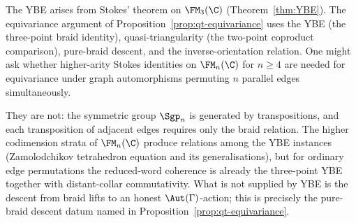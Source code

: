 \begin{remark}
\label{rem:stokes-hierarchy}
%
%
The YBE arises from Stokes' theorem on $\FM_3(\C)$
(Theorem~\ref{thm:YBE}). The equivariance argument of
Proposition~\ref{prop:qt-equivariance} uses the YBE
(the three-point braid identity), quasi-triangularity (the
two-point coproduct comparison), pure-braid descent, and the
inverse-orientation relation. One might ask whether higher-arity
Stokes identities on $\FM_n(\C)$ for $n \ge 4$ are needed
for equivariance under graph automorphisms permuting $n$
parallel edges simultaneously.

They are not: the symmetric group $\Sgp_n$ is generated by
transpositions, and each transposition of adjacent edges
requires only the braid relation.  The higher codimension strata of
$\FM_n(\C)$ produce relations among the YBE instances
(Zamolodchikov tetrahedron equation and its generalisations), but for
ordinary edge permutations the reduced-word coherence is already the
three-point YBE together with distant-collar commutativity.  What is
not supplied by YBE is the descent from braid lifts to an honest
$\Aut(\Gamma)$-action; this is precisely the pure-braid descent datum
named in Proposition~\ref{prop:qt-equivariance}.
\end{remark}


